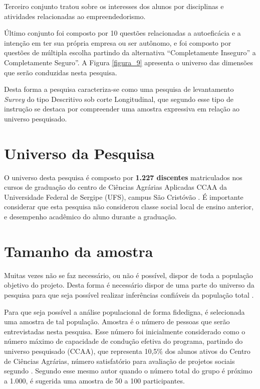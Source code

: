 Terceiro conjunto tratou sobre os interesses dos alunos por disciplinas e atividades relacionadas ao empreendedorismo.

Último conjunto foi composto por 10 questões relacionadas a autoeficácia e a intenção em ter sua própria empresa ou ser autônomo, e foi composto por questões de múltipla escolha partindo da alternativa “Completamente Inseguro” a Completamente Seguro”. A Figura \ref{figura_9} apresenta o universo das dimensões que serão conduzidas nesta pesquisa.



Desta forma a pesquisa caracteriza-se como uma pesquisa de levantamento  \textit{Survey} do tipo Descritivo sob corte Longitudinal, que segundo  esse tipo de instrução se destaca por compreender uma amostra expressiva em relação ao universo pesquisado.

\section{Universo da Pesquisa}

O universo desta pesquisa é composto por \textbf{1.227 discentes} matriculados nos cursos de graduação do centro de Ciências Agrárias Aplicadas CCAA da Universidade Federal de Sergipe (UFS), campus São Cristóvão \cite{andrade_ufs_2019}. É importante considerar que esta pesquisa não considerou classe social local de ensino anterior, e desempenho acadêmico do aluno durante a graduação.


\section{Tamanho da amostra}

Muitas  vezes  não  se  faz necessário,  ou não é possível, dispor de toda a população objetivo do projeto. Desta forma é necessário dispor de uma parte do universo da pesquisa para que seja possível realizar inferências confiáveis da população total \cite{marino_manual_2003}.

Para que seja possível a análise populacional de forma fidedigna, é selecionada uma amostra de tal população. Amostra é o número de pessoas que serão entrevistadas nesta pesquisa. Esse número foi inicialmente considerado como o número máximo de capacidade de condução efetiva do programa, partindo do universo pesquisado (CCAA), que  representa 10,5\% dos alunos ativos do Centro de Ciências Agrárias, número satisfatório para avaliação de projetos sociais segundo . Segundo esse mesmo autor quando o número total do grupo é próximo a 1.000, é sugerida uma amostra de 50 a 100 participantes.


